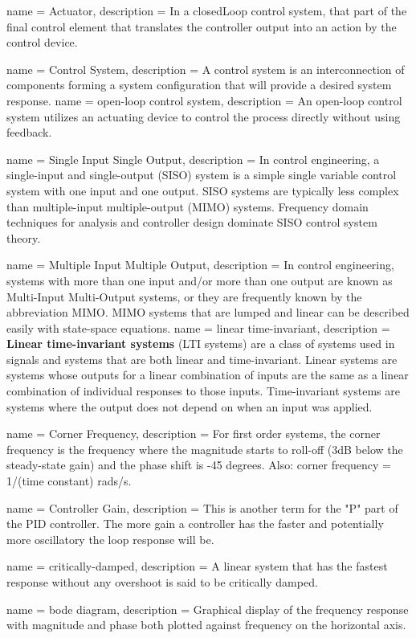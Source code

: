 {
	name = {Actuator},
	description = {
		 In a \gls{closedLoop} control system, that part of the final control element that translates the controller output into an action by the control device.}
}

{
	name = {Control System},
	description = {
		A control system is an interconnection of components forming a system configuration that will provide a desired system response.
	}
}
{
	name = {open-loop control system},
	description = {
		An open-loop control system utilizes an actuating device to control the process
		directly without using feedback.
	}
}

{
	name = {Single Input Single Output},
	description = {
		In control engineering, a single-input and single-output (SISO) system is a simple single variable control system with one input and one output. SISO systems are typically less complex than multiple-input multiple-output (MIMO) systems. Frequency domain techniques for analysis and controller design dominate SISO control system theory. }
}

{
	name = {Multiple Input Multiple Output},
	description = {
		In control engineering, systems with more than one input and/or more than one output are known as Multi-Input Multi-Output systems, or they are frequently known by the abbreviation MIMO. MIMO systems that are lumped and linear can be described easily with state-space equations.}
}
{
	name = {linear time-invariant},
	description = {
		\textbf{Linear time-invariant systems} (LTI systems) are a class of systems used in signals and systems that are both linear and time-invariant. Linear systems are systems whose outputs for a linear combination of inputs are the same as a linear combination of individual responses to those inputs. Time-invariant systems are systems where the output does not depend on when an input was applied. 
	}
}

{
	name = {Corner Frequency},
	description = {
	 For first order systems, the corner frequency is the frequency where the magnitude starts to roll-off (3dB below the steady-state gain) and the phase shift is -45 degrees. Also: corner frequency = 1/(time constant) rads/s.
	}
}

{
	name = {Controller Gain},
	description = {
		This is another term for the "P" part of the PID controller. The more gain a controller has the faster and potentially more oscillatory the loop response will be.
	}
}

{
	name = {critically-damped},
	description = {
		A linear system that has the fastest response without any overshoot is said to be critically damped.
	}
}

{
	name = {bode diagram},
	description = {
		Graphical display of the frequency response with magnitude and phase both plotted against frequency on the horizontal axis.
	}
}
